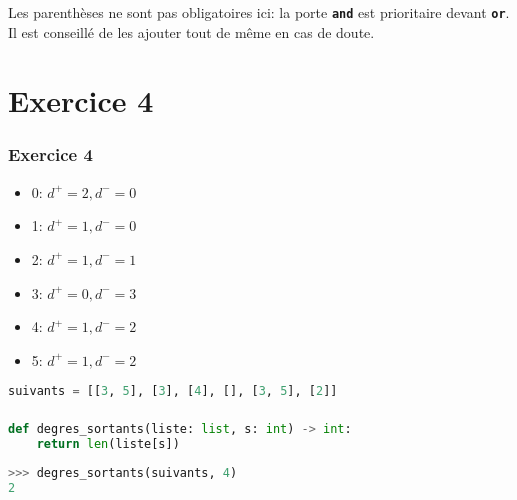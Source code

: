 \documentclass[svgnames,11pt]{beamer}
\begin{document}
\begin{frame}
    \frametitle{}

    \begin{aretenir}[Remarque]
    Les parenthèses ne sont pas obligatoires ici: la porte \textbf{\texttt{and}} est prioritaire devant \textbf{\texttt{or}}. Il est conseillé de les ajouter tout de même en cas de doute.
    \end{aretenir}

\end{frame}
\section{Exercice 4}
\begin{frame}[fragile]
    \frametitle{Exercice 4}


    \begin{itemize}
        \item 0: $d^+=2, d^-=0$
        \item 1: $d^+=1, d^-=0$
        \item 2: $d^+=1, d^-=1$
        \item 3: $d^+=0, d^-=3$
        \item 4: $d^+=1, d^-=2$
        \item 5: $d^+=1, d^-=2$
    \end{itemize}
    \begin{center}
\begin{lstlisting}[language=Python , basicstyle=\ttfamily\small, xleftmargin=1em, xrightmargin=0em]
suivants = [[3, 5], [3], [4], [], [3, 5], [2]]
\end{lstlisting}
\end{center}
\end{frame}
\begin{frame}[fragile]
    \frametitle{}

\begin{center}
\begin{lstlisting}[language=Python , basicstyle=\ttfamily\small, xleftmargin=1em, xrightmargin=0em]
def degres_sortants(liste: list, s: int) -> int:
    return len(liste[s])
\end{lstlisting}
\end{center}
\begin{center}
\begin{lstlisting}[language=Python , basicstyle=\ttfamily\small, xleftmargin=2em, xrightmargin=2em]
>>> degres_sortants(suivants, 4)
2
\end{lstlisting}
\label{CODE}
\end{center}
\end{frame}
\end{document}

